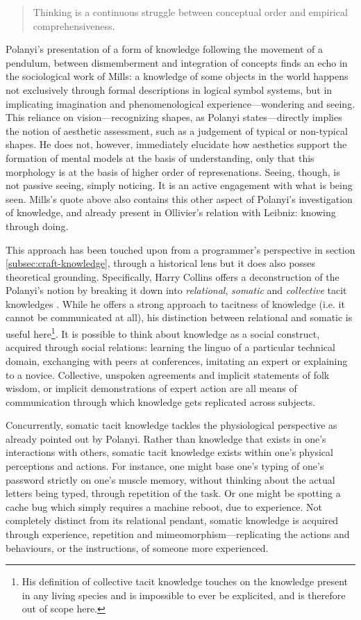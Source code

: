 \begin{quote}
    Thinking is a continuous struggle between conceptual order and empirical comprehensiveness. \citep{MillsC.WrightCharlesWright2000Tsi}
\end{quote}

Polanyi's presentation of a form of knowledge following the movement of a pendulum, between dismemberment and integration of concepts finds an echo in the sociological work of Mills: a knowledge of some objects in the world happens not exclusively through formal descriptions in logical symbol systems, but in implicating imagination and phenomenological experience—wondering and seeing. This reliance on vision—recognizing shapes, as Polanyi states—directly implies the notion of aesthetic assessment, such as a judgement of typical or non-typical shapes. He does not, however, immediately elucidate how aesthetics support the formation of mental models at the basis of understanding, only that this morphology is at the basis of higher order of represenations. Seeing, though, is not passive seeing, simply noticing. It is an active engagement with what is being seen. Mills's quote above also contains this other aspect of Polanyi's investigation of knowledge, and already present in Ollivier's relation with Leibniz: knowing through doing.

This approach has been touched upon from a programmer's perspective in section \ref{subsec:craft-knowledge}, through a historical lens but it does also posses theoretical grounding. Specifically, Harry Collins offers a deconstruction of the Polanyi's notion by breaking it down into \emph{relational}, \emph{somatic} and \emph{collective} tacit knowledges \citep{collins_tacit_2010}. While he offers a strong approach to tacitness of knowledge (i.e. it cannot be communicated at all), his distinction between relational and somatic is useful here\footnote{His definition of collective tacit knowledge touches on the knowledge present in any living species and is impossible to ever be explicited, and is therefore out of scope here.}. It is possible to think about knowledge as a social construct, acquired through social relations: learning the linguo of a particular technical domain, exchanging with peers at conferences, imitating an expert or explaining to a novice. Collective, unspoken agreements and implicit statements of folk wisdom, or implicit demonstrations of expert action are all means of communication through which knowledge gets replicated across subjects.

Concurrently, somatic tacit knowledge tackles the physiological perspective as already pointed out by Polanyi. Rather than knowledge that exists in one's interactions with others, somatic tacit knowledge exists within one's physical perceptions and actions. For instance, one might base one's typing of one's password strictly on one's muscle memory, without thinking about the actual letters being typed, through repetition of the task. Or one might be spotting a cache bug which simply requires a machine reboot, due to experience. Not completely distinct from its relational pendant, somatic knowledge is acquired through experience, repetition and mimeomorphism—replicating the actions and behaviours, or the instructions, of someone more experienced.

